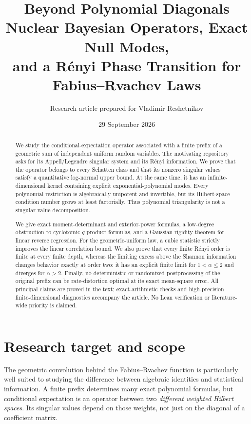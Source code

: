 \documentclass[11pt,a4paper]{article}
\title{\LARGE\bfseries Beyond Polynomial Diagonals\\[5pt]
\Large Nuclear Bayesian Operators, Exact Null Modes,\\
and a R\'enyi Phase Transition for Fabius--Rvachev Laws}
\author{Research article prepared for Vladimir Reshetnikov}
\date{29 September 2026}
\numberwithin{equation}{section}
\theoremstyle{definition}\newtheorem{definition}[theorem]{Definition}
\theoremstyle{remark}\newtheorem{remark}[theorem]{Remark}
\begin{document}
\maketitle
\begin{abstract}
We study the conditional-expectation operator associated with a finite prefix of a geometric sum of independent uniform random variables. The motivating repository asks for its Appell/Legendre singular system and its R\'enyi information. We prove that the operator belongs to every Schatten class and that its nonzero singular values satisfy a quantitative log-normal upper bound. At the same time, it has an infinite-dimensional kernel containing explicit exponential-polynomial modes. Every polynomial restriction is algebraically unipotent and invertible, but its Hilbert-space condition number grows at least factorially. Thus polynomial triangularity is not a singular-value decomposition.

We give exact moment-determinant and exterior-power formulas, a low-degree obstruction to cyclotomic $q$-product formulas, and a Gaussian rigidity theorem for linear reverse regression. For the geometric-uniform law, a cubic statistic strictly improves the linear correlation bound. We also prove that every finite R\'enyi order is finite at every finite depth, whereas the limiting excess above the Shannon information changes behavior exactly at order two: it has an explicit finite limit for $1<\alpha\le2$ and diverges for $\alpha>2$. Finally, no deterministic or randomized postprocessing of the original prefix can be rate-distortion optimal at its exact mean-square error. All principal claims are proved in the text; exact-arithmetic checks and high-precision finite-dimensional diagnostics accompany the article. No Lean verification or literature-wide priority is claimed.
\end{abstract}
\newpage
\tableofcontents
\newpage

\section{Research target and scope}
\label{sec:scope}
The geometric convolution behind the Fabius--Rvachev function is particularly well suited to studying the difference between algebraic identities and statistical information. A finite prefix determines many exact polynomial formulas, but conditional expectation is an operator between two \emph{different weighted Hilbert spaces}. Its singular values depend on those weights, not just on the diagonal of a coefficient matrix.
\end{document}
